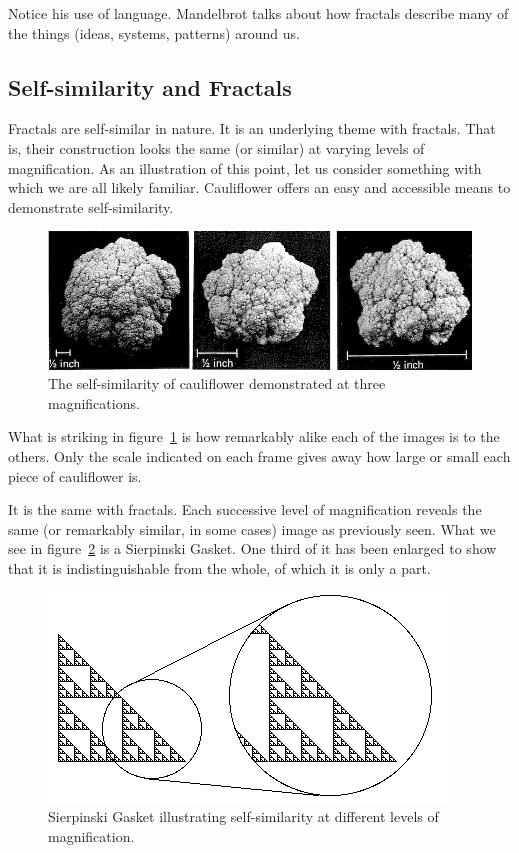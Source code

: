 \documentclass[jou,apacite]{apa6}
\begin{document}
Notice his use of language.  Mandelbrot talks about how fractals describe many of the things (ideas, systems, patterns) around us.  

\subsection{Self-similarity and Fractals}
Fractals are self-similar in nature.  It is an underlying theme with fractals.  That is, their construction looks the same (or similar) at varying levels of magnification.  As an illustration of this point, let us consider something with which we are all likely familiar.  Cauliflower offers an easy and accessible means to demonstrate self-similarity.  

\begin{figure}[htpb]
  \centering
  \includegraphics[width=\columnwidth]{images/cauliflower.png}
  \caption{The self-similarity of cauliflower demonstrated at three magnifications.}
  \label{fig:cauliflower}
\end{figure}

What is striking in figure~\ref{fig:cauliflower} is how remarkably alike each of the images is to the others.  Only the scale indicated on each frame gives away how large or small each piece of cauliflower is.

It is the same with fractals.  Each successive level of magnification reveals the same (or remarkably similar, in some cases) image as previously seen.  What we see in figure~\ref{fig:fractalmag} is a Sierpinski Gasket.  One third of it has been enlarged to show that it is indistinguishable from the whole, of which it is only a part.  

\begin{figure}[htpb]
  \centering
  \includegraphics[width=\columnwidth]{images/GasketMag.png}
  \caption{Sierpinski Gasket illustrating self-similarity at different levels of magnification.}
  \label{fig:fractalmag}
\end{figure}
\end{document}
